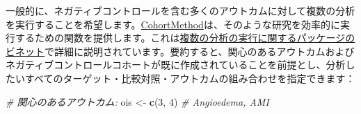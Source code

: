 \documentclass[
  11pt]{book}
\newenvironment{Shaded}{\begin{snugshade}}{\end{snugshade}}
\newcommand{\CommentTok}[1]{\textcolor[rgb]{0.56,0.35,0.01}{\textit{#1}}}
\newcommand{\DecValTok}[1]{\textcolor[rgb]{0.00,0.00,0.81}{#1}}
\newcommand{\FunctionTok}[1]{\textcolor[rgb]{0.13,0.29,0.53}{\textbf{#1}}}
\newcommand{\NormalTok}[1]{#1}
\newcommand{\OtherTok}[1]{\textcolor[rgb]{0.56,0.35,0.01}{#1}}
\theoremstyle{definition}
\theoremstyle{definition}
\theoremstyle{definition}
\theoremstyle{definition}
\theoremstyle{remark}
\begin{document}
一般的に、ネガティブコントロールを含む多くのアウトカムに対して複数の分析を実行することを希望します。\href{https://ohdsi.github.io/CohortMethod/}{CohortMethod}は、そのような研究を効率的に実行するための関数を提供します。これは\href{https://ohdsi.github.io/CohortMethod/articles/MultipleAnalyses.html}{複数の分析の実行に関するパッケージのビネット}で詳細に説明されています。要約すると、関心のあるアウトカムおよびネガティブコントロールコホートが既に作成されていることを前提とし、分析したいすべてのターゲット・比較対照・アウトカムの組み合わせを指定できます：

\begin{Shaded}
\begin{Highlighting}[]
\CommentTok{\# 関心のあるアウトカム:}
\NormalTok{ois }\OtherTok{\textless{}{-}} \FunctionTok{c}\NormalTok{(}\DecValTok{3}\NormalTok{, }\DecValTok{4}\NormalTok{) }\CommentTok{\# Angioedema, AMI}


\end{Highlighting}
\end{Shaded}
\end{document}
